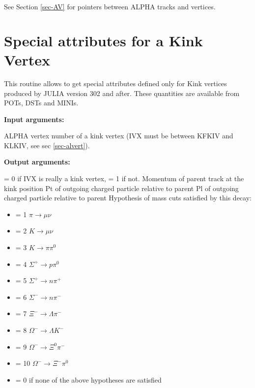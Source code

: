 See Section \ref{sec-AV} for pointers between ALPHA tracks and
vertices.


\section{\label{sec-TVKINK}Special attributes for a Kink Vertex}
\par

\par
{}
\par
This routine allows to get special attributes defined only for Kink vertices
produced by JULIA version 302 and after. These quantities are available from POTs, DSTs and MINIs.
\par
{\bf Input arguments:}
\begin{indentlist}{ 3.50cm}{ 3.75cm}
ALPHA vertex number of a kink vertex (IVX must be between KFKIV and KLKIV, see sec \ref{sec-alvert}).
\end{indentlist}
\par
{\bf Output arguments:}
\begin{indentlist}{ 3.50cm}{ 3.75cm}
 = 0 if IVX is really a kink vertex, = 1 if not.           
 Momentum of parent track at the kink position
 Pt of outgoing charged particle relative to parent
 Pl of outgoing charged particle relative to parent
 Hypothesis of mass cuts satisfied by this decay:  
\begin{itemize}
\item = 1  $\pi        \rightarrow  \mu \nu$
\item = 2  $K          \rightarrow  \mu \nu$
\item = 3  $K          \rightarrow  \pi \pi^{0}$
\item = 4  $\Sigma^{+} \rightarrow  p \pi^{0}$
\item = 5  $\Sigma^{+} \rightarrow  n \pi^{+} $
\item = 6  $\Sigma^{-} \rightarrow  n \pi^{-} $
\item = 7  $\Xi^{-}    \rightarrow  \Lambda \pi^{-}$
\item = 8  $\Omega^{-} \rightarrow  \Lambda K^{-}$
\item = 9  $\Omega^{-} \rightarrow  \Xi^{0} \pi^{-}$
\item = 10 $\Omega^{-} \rightarrow  \Xi^{-} \pi^{0}$
\item = 0  if none of the above hypotheses are satisfied
\end{itemize}

\end{indentlist}


